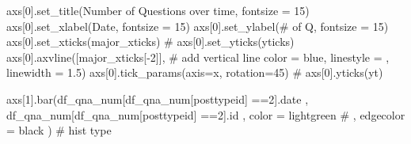 \documentclass[
  letterpaper,
  DIV=11,
  numbers=noendperiod]{scrartcl}
\newenvironment{Shaded}{\begin{snugshade}}{\end{snugshade}}
\newcommand{\BuiltInTok}[1]{\textcolor[rgb]{0.00,0.23,0.31}{#1}}
\newcommand{\CommentTok}[1]{\textcolor[rgb]{0.37,0.37,0.37}{#1}}
\newcommand{\DecValTok}[1]{\textcolor[rgb]{0.68,0.00,0.00}{#1}}
\newcommand{\FloatTok}[1]{\textcolor[rgb]{0.68,0.00,0.00}{#1}}
\newcommand{\NormalTok}[1]{\textcolor[rgb]{0.00,0.23,0.31}{#1}}
\newcommand{\OperatorTok}[1]{\textcolor[rgb]{0.37,0.37,0.37}{#1}}
\newcommand{\StringTok}[1]{\textcolor[rgb]{0.13,0.47,0.30}{#1}}
\begin{document}
\begin{Shaded}
\begin{Highlighting}[]
\NormalTok{axs[}\DecValTok{0}\NormalTok{].set\_title(}\StringTok{\textquotesingle{}Number of Questions over time\textquotesingle{}}\NormalTok{, fontsize }\OperatorTok{=} \DecValTok{15}\NormalTok{)}
\NormalTok{axs[}\DecValTok{0}\NormalTok{].set\_xlabel(}\StringTok{\textquotesingle{}Date\textquotesingle{}}\NormalTok{, fontsize }\OperatorTok{=} \DecValTok{15}\NormalTok{)}
\NormalTok{axs[}\DecValTok{0}\NormalTok{].set\_ylabel(}\StringTok{\textquotesingle{}\# of Q\textquotesingle{}}\NormalTok{, fontsize }\OperatorTok{=} \DecValTok{15}\NormalTok{)}
\NormalTok{axs[}\DecValTok{0}\NormalTok{].set\_xticks(major\_xticks)}
\CommentTok{\# axs[0].set\_yticks(yticks)}
\NormalTok{axs[}\DecValTok{0}\NormalTok{].axvline([major\_xticks[}\OperatorTok{{-}}\DecValTok{2}\NormalTok{]], }\CommentTok{\# add vertical line}
\NormalTok{           color }\OperatorTok{=} \StringTok{\textquotesingle{}blue\textquotesingle{}}\NormalTok{,}
\NormalTok{           linestyle }\OperatorTok{=} \StringTok{\textquotesingle{}{-}{-}\textquotesingle{}}\NormalTok{,}
\NormalTok{           linewidth }\OperatorTok{=} \FloatTok{1.5}\NormalTok{)}
\NormalTok{axs[}\DecValTok{0}\NormalTok{].tick\_params(axis}\OperatorTok{=}\StringTok{\textquotesingle{}x\textquotesingle{}}\NormalTok{, rotation}\OperatorTok{=}\DecValTok{45}\NormalTok{)}
\CommentTok{\# axs[0].yticks(yt)}

\NormalTok{axs[}\DecValTok{1}\NormalTok{].bar(df\_qna\_num[df\_qna\_num[}\StringTok{\textquotesingle{}posttypeid\textquotesingle{}}\NormalTok{] }\OperatorTok{==}\StringTok{\textquotesingle{}2\textquotesingle{}}\NormalTok{].date}
\NormalTok{        ,  df\_qna\_num[df\_qna\_num[}\StringTok{\textquotesingle{}posttypeid\textquotesingle{}}\NormalTok{] }\OperatorTok{==}\StringTok{\textquotesingle{}2\textquotesingle{}}\NormalTok{].}\BuiltInTok{id}
\NormalTok{        ,  color }\OperatorTok{=} \StringTok{\textquotesingle{}lightgreen\textquotesingle{}}
        \CommentTok{\# ,  edgecolor = \textquotesingle{}black\textquotesingle{}}
\NormalTok{      ) }\CommentTok{\# hist type}


\end{Highlighting}
\end{Shaded}
\end{document}
